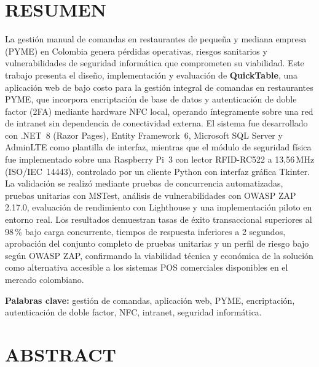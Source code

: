\newpage
\chapter*{RESUMEN}

La gestión manual de comandas en restaurantes de pequeña y mediana empresa (PYME) en 
Colombia genera pérdidas operativas, riesgos sanitarios y vulnerabilidades de seguridad 
informática que comprometen su viabilidad. Este trabajo presenta el diseño, implementación 
y evaluación de \textbf{QuickTable}, una aplicación web de bajo costo para la gestión 
integral de comandas en restaurantes PYME, que incorpora encriptación de base de datos y 
autenticación de doble factor (2FA) mediante hardware NFC local, operando íntegramente 
sobre una red de intranet sin dependencia de conectividad externa. El sistema fue 
desarrollado con .NET~8 (Razor Pages), Entity Framework~6, Microsoft SQL Server y 
AdminLTE como plantilla de interfaz, mientras que el módulo de seguridad física fue 
implementado sobre una Raspberry Pi~3 con lector RFID-RC522 a 13,56\,MHz (ISO/IEC~14443), 
controlado por un cliente Python con interfaz gráfica Tkinter. La validación se realizó 
mediante pruebas de concurrencia automatizadas, pruebas unitarias con MSTest, análisis de 
vulnerabilidades con OWASP ZAP 2.17.0, evaluación de rendimiento con Lighthouse y una 
implementación piloto en entorno real. Los resultados demuestran tasas de éxito 
transaccional superiores al 98\,\% bajo carga concurrente, tiempos de respuesta inferiores 
a 2 segundos, aprobación del conjunto completo de pruebas unitarias y un perfil de riesgo 
bajo según OWASP ZAP, confirmando la viabilidad técnica y económica de la solución como 
alternativa accesible a los sistemas POS comerciales disponibles en el mercado colombiano.

\bigskip
\noindent\textbf{Palabras clave:} gestión de comandas, aplicación web, PYME, encriptación, 
autenticación de doble factor, NFC, intranet, seguridad informática.


\chapter*{ABSTRACT}

